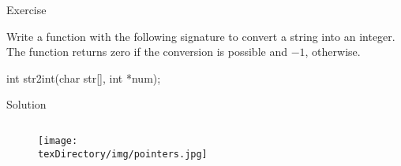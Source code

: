 \documentclass[compress]{beamer}
\begin{document}
\begin{slide}
	\begin{block}{Exercise}

	Write a function with the following signature to convert a string into an integer.
	The function returns zero if the conversion is possible and $-1$, otherwise.

	\begin{terminal}
	int str2int(char str[], int *num);
	\end{terminal}

	\end{block}
\end{slide}

\begin{slide}
	\begin{block}{Solution}

	\inputminted[fontsize=\scriptsize, firstline=14, lastline=31, linenos]{c}{
		\resDirectory/ls10-str2int.c
	}

	\end{block}
\end{slide}


\begin{slide}
	\begin{figure}
	\texttt{[image: \\texDirectory/img/pointers.jpg]}
	\end{figure}
\end{slide}
\end{document}
